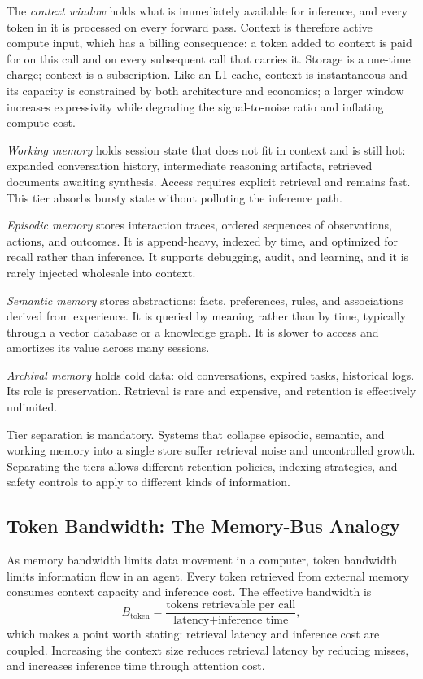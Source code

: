 \documentclass[11pt]{book}
\begin{document}
The \textit{context window} holds what is immediately available for inference, and every token in it is processed on every forward pass. Context is therefore active compute input, which has a billing consequence: a token added to context is paid for on this call and on every subsequent call that carries it. Storage is a one-time charge; context is a subscription. Like an L1 cache, context is instantaneous and its capacity is constrained by both architecture and economics; a larger window increases expressivity while degrading the signal-to-noise ratio and inflating compute cost.

\textit{Working memory} holds session state that does not fit in context and is still hot: expanded conversation history, intermediate reasoning artifacts, retrieved documents awaiting synthesis. Access requires explicit retrieval and remains fast. This tier absorbs bursty state without polluting the inference path.

\textit{Episodic memory} stores interaction traces, ordered sequences of observations, actions, and outcomes. It is append-heavy, indexed by time, and optimized for recall rather than inference. It supports debugging, audit, and learning, and it is rarely injected wholesale into context.

\textit{Semantic memory} stores abstractions: facts, preferences, rules, and associations derived from experience. It is queried by meaning rather than by time, typically through a vector database or a knowledge graph. It is slower to access and amortizes its value across many sessions.

\textit{Archival memory} holds cold data: old conversations, expired tasks, historical logs. Its role is preservation. Retrieval is rare and expensive, and retention is effectively unlimited.

Tier separation is mandatory. Systems that collapse episodic, semantic, and working memory into a single store suffer retrieval noise and uncontrolled growth. Separating the tiers allows different retention policies, indexing strategies, and safety controls to apply to different kinds of information.

\subsection{Token Bandwidth: The Memory-Bus Analogy}

As memory bandwidth limits data movement in a computer, token bandwidth limits information flow in an agent. Every token retrieved from external memory consumes context capacity and inference cost. The effective bandwidth is
\[
B_{\text{token}} = \frac{\text{tokens retrievable per call}}{\text{latency} + \text{inference time}},
\]
which makes a point worth stating: retrieval latency and inference cost are coupled. Increasing the context size reduces retrieval latency by reducing misses, and increases inference time through attention cost.
\end{document}
